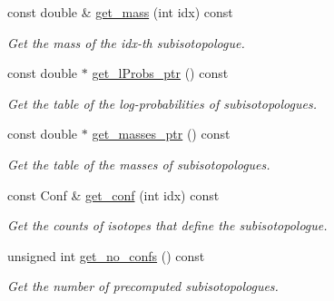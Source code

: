 \begin{DoxyCompactItemize}
const double \& \mbox{\hyperlink{class_iso_spec_1_1_precalculated_marginal_ada12caa2e195c1a16c5158a428ea3ed2}{get\+\_\+mass}} (int idx) const
\begin{DoxyCompactList}\small\item\em Get the mass of the idx-\/th subisotopologue. \end{DoxyCompactList}\item 
const double $\ast$ \mbox{\hyperlink{class_iso_spec_1_1_precalculated_marginal_af5d01500c7efb8cba57399ba11fc7124}{get\+\_\+l\+Probs\+\_\+ptr}} () const
\begin{DoxyCompactList}\small\item\em Get the table of the log-\/probabilities of subisotopologues. \end{DoxyCompactList}\item 
const double $\ast$ \mbox{\hyperlink{class_iso_spec_1_1_precalculated_marginal_a9a768b90299ea16c447a392dbe1123b5}{get\+\_\+masses\+\_\+ptr}} () const
\begin{DoxyCompactList}\small\item\em Get the table of the masses of subisotopologues. \end{DoxyCompactList}\item 
const Conf \& \mbox{\hyperlink{class_iso_spec_1_1_precalculated_marginal_a3ecbbf1263a274cc8e3bc71cd96f0bff}{get\+\_\+conf}} (int idx) const
\begin{DoxyCompactList}\small\item\em Get the counts of isotopes that define the subisotopologue. \end{DoxyCompactList}\item 
unsigned int \mbox{\hyperlink{class_iso_spec_1_1_precalculated_marginal_a0dbf1ec53eac9953a354c11e1b0803f9}{get\+\_\+no\+\_\+confs}} () const
\begin{DoxyCompactList}\small\item\em Get the number of precomputed subisotopologues. \end{DoxyCompactList}\end{DoxyCompactItemize}

